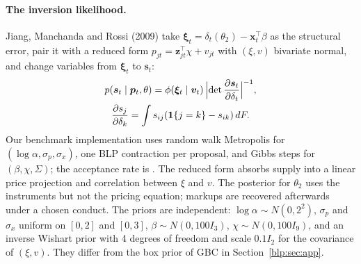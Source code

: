 \paragraph{The inversion likelihood.} Jiang, Manchanda and Rossi (2009) take $\bm\xi_t = \delta_t(\theta_2) - \bm x_t^\top\beta$ as the structural error,
pair it with a reduced form $p_{jt} = \bm z_{jt}^\top\chi + v_{jt}$ with $(\xi,v)$ bivariate normal,
and change variables from $\bm\xi_t$ to $\bm s_t$:
\[
\begin{gathered}
p(\bm s_t\mid\bm p_t,\theta) = \phi(\bm\xi_t\mid\bm v_t)\,\Bigl\lvert\det\frac{\partial\bm s_t}{\partial\delta_t}\Bigr\rvert^{-1},\\
\frac{\partial s_j}{\partial\delta_k} = \int s_{ij}(\mathbf 1\{j=k\}-s_{ik})\,dF .
\end{gathered}
\]
Our benchmark implementation uses random walk Metropolis for $(\log\alpha,\sigma_p,\sigma_x)$, one
BLP contraction per proposal, and Gibbs steps for $(\beta,\chi,\Sigma)$; the acceptance rate is
\numjmracc. The reduced form absorbs supply into a linear price projection and correlation between $\xi$ and $v$. The posterior for $\theta_2$ uses the instruments but not the pricing equation; markups are recovered afterwards under a chosen conduct. The priors are independent: $\log\alpha\sim N(0,2^2)$, $\sigma_p$ and $\sigma_x$ uniform on $[0,2]$ and $[0,3]$, $\beta\sim N(0,100I_3)$, $\chi\sim N(0,100I_9)$, and an inverse Wishart prior with 4 degrees of freedom and scale $0.1I_2$ for the covariance of $(\xi,v)$. They differ from the box prior of GBC in Section~\ref{blp:sec:app}.


